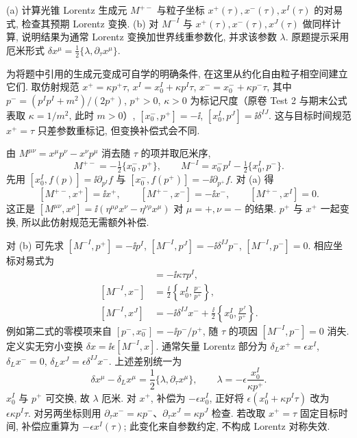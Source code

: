 \begin{exercise}
(a) 计算光锥 Lorentz 生成元 $M^{+-}$ 与粒子坐标 $x^+(\tau),x^-(\tau),x^I(\tau)$ 的对易式, 检查其预期 Lorentz 变换.
(b) 对 $M^{-I}$ 与 $x^+(\tau),x^-(\tau),x^J(\tau)$ 做同样计算, 说明结果为通常 Lorentz 变换加世界线重参数化, 并求该参数 $\lambda$. 原题提示采用厄米形式
$\delta x^\mu=\frac12\{\lambda,\partial_\tau x^\mu\}$.
\end{exercise}
\begin{solution}
为将题中引用的生成元变成可自学的明确条件, 在这里从约化自由粒子相空间建立它们. 取仿射规范 $x^+=\kappa p^+\tau$, $x^I=x_0^I+\kappa p^I\tau$, $x^-=x_0^-+\kappa p^-\tau$, 其中 $p^-=(p^Ip^I+m^2)/(2p^+)$, $p^+>0$, $\kappa>0$ 为标记尺度（原卷 Test 2 与期末公式表取 $\kappa=1/m^2$, 此时 $m>0$）, $[x_0^-,p^+]=-\ii$, $[x_0^I,p^J]=\ii\delta^{IJ}$. 这与目标时间规范 $x^+=\tau$ 只差参数重标记, 但变换补偿式会不同.

由 $M^{\mu\nu}=x^\mu p^\nu-x^\nu p^\mu$ 消去随 $\tau$ 的项并取厄米序,
\[
 M^{+-}=-\tfrac12\{x_0^-,p^+\},\qquad
 M^{-I}=x_0^-p^I-\tfrac12\{x_0^I,p^-\}.
\]
先用 $[x_0^I,f(p)]=\ii\partial_{p^I}f$ 与
$[x_0^-,f(p^+)]=-\ii\partial_{p^+}f$. 对 (a) 得
\[
 [M^{+-},x^+]=\ii x^+,\qquad
 [M^{+-},x^-]=-\ii x^-,\qquad[M^{+-},x^I]=0.
\]
这正是 $[M^{\mu\nu},x^\rho]=\ii(\eta^{\mu\rho}x^\nu-\eta^{\nu\rho}x^\mu)$ 对 $\mu=+,\nu=-$ 的结果. $p^+$ 与 $x^+$ 一起变换, 所以此仿射规范无需额外补偿.

对 (b) 可先求 $[M^{-I},p^+]=-\ii p^I$,
$[M^{-I},p^J]=-\ii\delta^{IJ}p^-$,
$[M^{-I},p^-]=0$. 相应坐标对易式为
\begin{align*}
 [M^{-I},x^+]&=-\ii\kappa\tau p^I,\\
 [M^{-I},x^-]&=\frac\ii2\left\{x_0^I,\frac{p^-}{p^+}\right\},\\
 [M^{-I},x^J]&=-\ii\delta^{IJ}x^-
 +\frac\ii2\left\{x_0^I,\frac{p^J}{p^+}\right\}.
\end{align*}
例如第二式的零模项来自
$[p^-,x_0^-]=-\ii p^-/p^+$, 随 $\tau$ 的项因 $[M^{-I},p^-]=0$ 消失. 定义实无穷小变换 $\delta x=\ii\epsilon[M^{-I},x]$. 通常矢量 Lorentz 部分为 $\delta_Lx^+=\epsilon x^I$, $\delta_Lx^-=0$, $\delta_Lx^J=\epsilon\delta^{IJ}x^-$. 上述差别统一为
\[
 \delta x^\mu-\delta_Lx^\mu
 =\frac12\{\lambda,\partial_\tau x^\mu\},
 \qquad\lambda=-\epsilon\frac{x_0^I}{\kappa p^+}.
\]
$x_0^I$ 与 $p^+$ 可交换, 故 $\lambda$ 厄米. 对 $x^+$, 补偿为 $-\epsilon x_0^I$, 正好将 $\epsilon(x_0^I+\kappa p^I\tau)$ 改为 $\epsilon\kappa p^I\tau$. 对另两坐标则用 $\partial_\tau x^-=\kappa p^-$、$\partial_\tau x^J=\kappa p^J$ 检查. 若改取 $x^+=\tau$ 固定目标时间, 补偿应重算为 $-\epsilon x^I(\tau)$; 此变化来自参数约定, 不构成 Lorentz 对称失效.
\end{solution}

